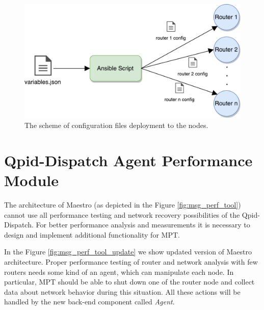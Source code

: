 \begin{figure}[H]
  \centering
  \includegraphics[width=12cm]{obrazky-figures/deployment.pdf}
  \caption{The scheme of configuration files deployment to the nodes.}
  \label{fig:deployment}
\end{figure}


\section{Qpid-Dispatch Agent Performance Module}
The architecture of Maestro (as depicted in the Figure \ref{fig:msg_perf_tool}) cannot use all performance testing and network recovery possibilities of the Qpid-Dispatch. For better performance analysis and measurements it is necessary to design and implement additional functionality for MPT.

In the Figure \ref{fig:msg_perf_tool_update} we show updated version of Maestro architecture. Proper performance testing of router and network analysis with few routers needs some kind of an agent, which can manipulate each node. In particular, MPT should be able to shut down one of the router node and collect data about network behavior during this situation. All these actions will be handled by the new back-end component called \emph{Agent}.

